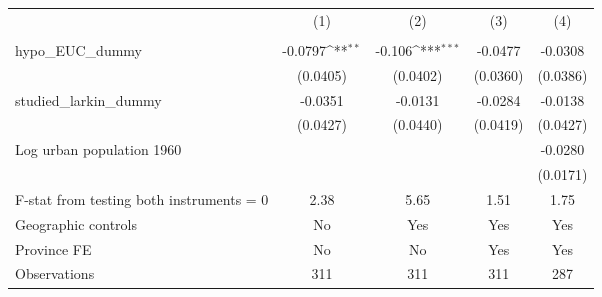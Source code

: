 {
\def\sym#1{\ifmmode^{#1}\else\(^{#1}\)\fi}
\begin{tabular}{l*{4}{c}}
\hline\hline
                &\multicolumn{1}{c}{(1)}&\multicolumn{1}{c}{(2)}&\multicolumn{1}{c}{(3)}&\multicolumn{1}{c}{(4)}\\
                &\multicolumn{1}{c}{}&\multicolumn{1}{c}{}&\multicolumn{1}{c}{}&\multicolumn{1}{c}{}\\
\hline
hypo\_EUC\_dummy  &  -0.0797\sym{**} &   -0.106\sym{***}&  -0.0477         &  -0.0308         \\
                & (0.0405)         & (0.0402)         & (0.0360)         & (0.0386)         \\
[1em]
studied\_larkin\_dummy&  -0.0351         &  -0.0131         &  -0.0284         &  -0.0138         \\
                & (0.0427)         & (0.0440)         & (0.0419)         & (0.0427)         \\
[1em]
Log urban population 1960&                  &                  &                  &  -0.0280         \\
                &                  &                  &                  & (0.0171)         \\
\hline
F-stat from testing both instruments = 0&     2.38         &     5.65         &     1.51         &     1.75         \\
Geographic controls&       No         &      Yes         &      Yes         &      Yes         \\
Province FE     &       No         &       No         &      Yes         &      Yes         \\
Observations    &      311         &      311         &      311         &      287         \\
\hline\hline
\end{tabular}
}
